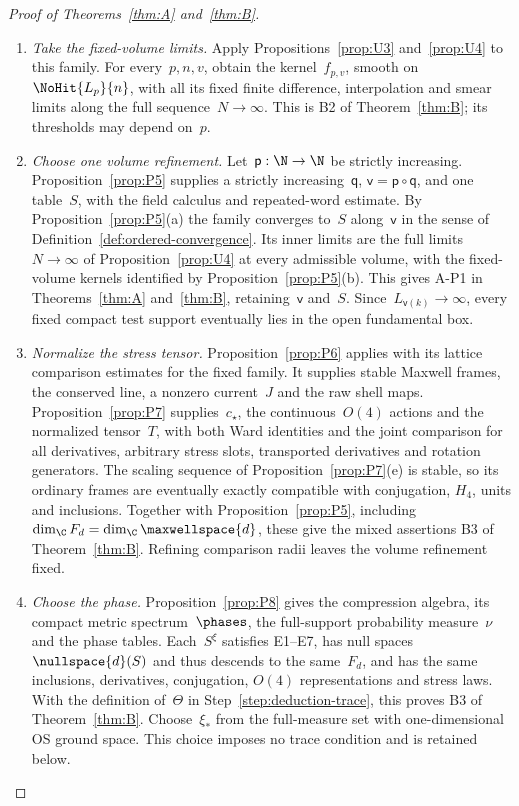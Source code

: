 \begin{proof}[Proof of Theorems~\ref{thm:A} and~\ref{thm:B}]
\begin{enumerate}[label=\emph{Step \arabic*:},ref=\arabic*,leftmargin=4.5em,itemsep=0.4em,beginpenalty=10000]
\item\label{step:deduction-uv} \emph{Take the fixed-volume limits.} Apply Propositions~\ref{prop:U3} and~\ref{prop:U4} to this family. For every~$p,n,v$, obtain the kernel~$f_{p,v}$, smooth on~$\NoHit{L_p}{n}$, with all its fixed finite difference, interpolation and smear limits along the full sequence~$N\to\infty$. This is B2 of Theorem~\ref{thm:B}; its thresholds may depend on~$p$.

\item\label{step:deduction-volume} \emph{Choose one volume refinement.} Let~$\mathsf p:\N\to\N$ be strictly increasing. Proposition~\ref{prop:P5} supplies a strictly increasing~$\mathsf q$, $\mathsf v=\mathsf p\circ\mathsf q$, and one table~$S$, with the field calculus and repeated-word estimate. By Proposition~\ref{prop:P5}(a) the family converges to~$S$ along~$\mathsf v$ in the sense of Definition~\ref{def:ordered-convergence}. Its inner limits are the full limits~$N\to\infty$ of Proposition~\ref{prop:U4} at every admissible volume, with the fixed-volume kernels identified by Proposition~\ref{prop:P5}(b). This gives A-P1 in Theorems~\ref{thm:A} and~\ref{thm:B}, retaining~$\mathsf v$ and~$S$. Since~$L_{\mathsf v(k)}\to\infty$, every fixed compact test support eventually lies in the open fundamental box.

\item\label{step:deduction-stress} \emph{Normalize the stress tensor.} Proposition~\ref{prop:P6} applies with its lattice comparison estimates for the fixed family. It supplies stable Maxwell frames, the conserved line, a nonzero current~$J$ and the raw shell maps. Proposition~\ref{prop:P7} supplies~$c_\star$, the continuous~$O(4)$ actions and the normalized tensor~$T$, with both Ward identities and the joint comparison for all derivatives, arbitrary stress slots, transported derivatives and rotation generators. The scaling sequence of Proposition~\ref{prop:P7}(e) is stable, so its ordinary frames are eventually exactly compatible with conjugation, $H_4$, units and inclusions. Together with Proposition~\ref{prop:P5}, including $\dim_{\C}F_d=\dim_{\C}\maxwellspace{d}$, these give the mixed assertions B3 of Theorem~\ref{thm:B}. Refining comparison radii leaves the volume refinement fixed.

\item\label{step:deduction-phase} \emph{Choose the phase.} Proposition~\ref{prop:P8} gives the compression algebra, its compact metric spectrum~$\phases$, the full-support probability measure~$\nu$ and the phase tables. Each~$S^\xi$ satisfies E1--E7, has null spaces~$\nullspace{d}(S)$ and thus descends to the same~$F_d$, and has the same inclusions, derivatives, conjugation, $O(4)$ representations and stress laws. With the definition of~$\Theta$ in Step~\ref{step:deduction-trace}, this proves B3 of Theorem~\ref{thm:B}. Choose~$\xi_*$ from the full-measure set with one-dimensional OS ground space. This choice imposes no trace condition and is retained below.


\end{enumerate}
\end{proof}
